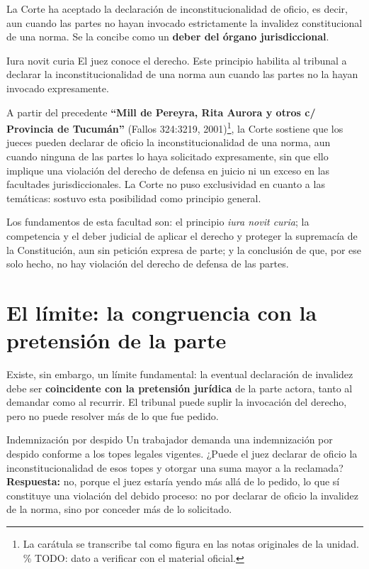 \documentclass[12pt,oneside]{book}
\begin{document}
La Corte ha aceptado la declaración de inconstitucionalidad de oficio, es decir, aun cuando las partes no hayan invocado estrictamente la invalidez constitucional de una norma. Se la concibe como un \textbf{deber del órgano jurisdiccional}.

\begin{definition}{Iura novit curia}
El juez conoce el derecho. Este principio habilita al tribunal a declarar la inconstitucionalidad de una norma aun cuando las partes no la hayan invocado expresamente.
\end{definition}

A partir del precedente \textbf{``Mill de Pereyra, Rita Aurora y otros c/ Provincia de Tucumán''} (Fallos 324:3219, 2001)\footnote{La carátula se transcribe tal como figura en las notas originales de la unidad. \% TODO: dato a verificar con el material oficial.}, la Corte sostiene que los jueces pueden declarar de oficio la inconstitucionalidad de una norma, aun cuando ninguna de las partes lo haya solicitado expresamente, sin que ello implique una violación del derecho de defensa en juicio ni un exceso en las facultades jurisdiccionales. La Corte no puso exclusividad en cuanto a las temáticas: sostuvo esta posibilidad como principio general.

Los fundamentos de esta facultad son: el principio \textit{iura novit curia}; la competencia y el deber judicial de aplicar el derecho y proteger la supremacía de la Constitución, aun sin petición expresa de parte; y la conclusión de que, por ese solo hecho, no hay violación del derecho de defensa de las partes.

\section{El límite: la congruencia con la pretensión de la parte}

Existe, sin embargo, un límite fundamental: la eventual declaración de invalidez debe ser \textbf{coincidente con la pretensión jurídica} de la parte actora, tanto al demandar como al recurrir. El tribunal puede suplir la invocación del derecho, pero no puede resolver más de lo que fue pedido.

\begin{example}{Indemnización por despido}
Un trabajador demanda una indemnización por despido conforme a los topes legales vigentes. ¿Puede el juez declarar de oficio la inconstitucionalidad de esos topes y otorgar una suma mayor a la reclamada? \textbf{Respuesta:} no, porque el juez estaría yendo más allá de lo pedido, lo que sí constituye una violación del debido proceso: no por declarar de oficio la invalidez de la norma, sino por conceder más de lo solicitado.
\end{example}
\end{document}

